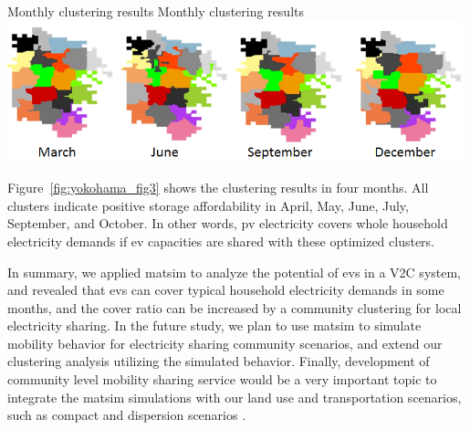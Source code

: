 {}
%
\createfigure%
{Monthly clustering results}%
{Monthly clustering results}%
{\label{fig:yokohama_fig3}}%
{\includegraphics[width=0.99\textwidth, angle=0]{./scenarios/figures/yokohama_fig3.png}}%
{}

Figure~\ref{fig:yokohama_fig3} shows the clustering results in four months. All clusters indicate positive storage affordability in April, May, June, July, September, and October. In other words, \gls{pv} electricity covers whole household electricity demands if \gls{ev} capacities are shared with these optimized clusters.

In summary, we applied \gls{matsim} to analyze the potential of \glspl{ev} in a V2C system, and revealed that \glspl{ev} can cover typical household electricity demands in some months, and the cover ratio can be increased by a community clustering for local electricity sharing. In the future study, we plan to use \gls{matsim} to simulate mobility behavior for electricity sharing community scenarios, and extend our clustering analysis utilizing the simulated behavior. Finally, development of community level mobility sharing service would be a very important topic to integrate the \gls{matsim} simulations with our land use and transportation scenarios, such as compact and dispersion scenarios \citep[see][]{YamagataEtAl_AoG_2013}.

